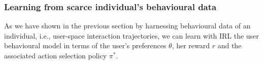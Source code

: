 \subsubsection{Learning from scarce individual's behavioural data}
\label{sec:clustering like behaving users}

As we have shown in the previous section by harnessing behavioural data of an individual, i.e., user-space interaction trajectories, we can learn with IRL the user behavioural model in terms of the user's preferences $\theta$, her reward $r$ and the associated action selection policy $\pi^*$. 

